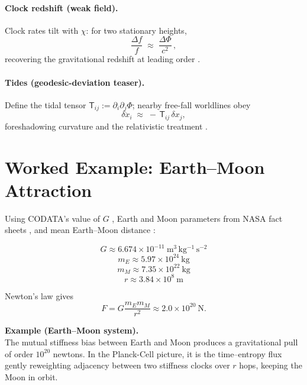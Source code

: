 \documentclass[11pt,oneside]{article}
\begin{document}
\paragraph{Clock redshift (weak field).}
Clock rates tilt with $\chi$: for two stationary heights,
\[
\frac{\Delta f}{f} \;\approx\; \frac{\Delta \Phi}{c^2}\,,
\]
recovering the gravitational redshift at leading order \cite{einstein1916foundation,will2014confrontation}.

\paragraph{Tides (geodesic-deviation teaser).}
Define the tidal tensor $\mathsf{T}_{ij}:=\partial_i\partial_j\Phi$; nearby free-fall worldlines obey
\[
\delta\ddot{x}_i \;\approx\; -\,\mathsf{T}_{ij}\,\delta x_j,
\]
foreshadowing curvature and the relativistic treatment \cite{einstein1916foundation}.

\section{Worked Example: Earth--Moon Attraction}
Using CODATA’s value of $G$ \cite{codata2018}, Earth and Moon parameters from NASA fact sheets
\cite{nasa_earth_fact,nasa_moon_fact}, and mean Earth–Moon distance \cite{nasa_moon_fact}:

\[
G \approx 6.674\times 10^{-11}\ \mathrm{m^3\,kg^{-1}\,s^{-2}}
\]
\[
m_E\approx 5.97\times 10^{24}\ \mathrm{kg}
\]
\[
m_M\approx 7.35\times 10^{22}\ \mathrm{kg}
\]
\[
r\approx 3.84\times 10^{8}\ \mathrm{m}
\]

Newton’s law gives
\[
F = G\frac{m_E m_M}{r^2}
   \approx 2.0\times 10^{20}\ \mathrm{N}.
\]

\begin{tcolorbox}
\textbf{Example (Earth--Moon system).}\\
The mutual stiffness bias between Earth and Moon produces a gravitational pull of order
$10^{20}$ newtons. In the Planck-Cell picture, it is the time--entropy flux gently reweighting
adjacency between two stiffness clocks over $r$ hops, keeping the Moon in orbit.
\end{tcolorbox}
\end{document}
